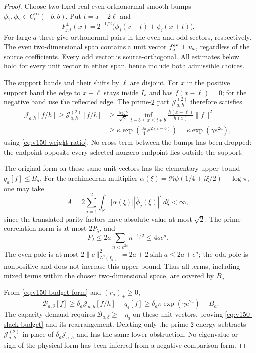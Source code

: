 \begin{proof}
Choose two fixed real even orthonormal smooth bumps
$\phi_1,\phi_2\in C_c^\infty(-b,b)$. Put $t=a-2\ell$ and
\[
 F_{j,t}^{\pm}(x)=2^{-1/2}\bigl(\phi_j(x-t)\pm\phi_j(x+t)\bigr).
\]
For large $a$ these give orthonormal pairs in the even and odd sectors,
respectively. The even two-dimensional span contains a unit vector
$f_a^{\rm ev}\perp u_a$, regardless of the source coefficients. Every
odd vector is source-orthogonal. All estimates below hold for every
unit vector in either span, hence include both admissible choices.

The support bands and their shifts by $\ell$ are disjoint. For $x$ in
the positive support band the edge to $x-\ell$ stays inside $I_a$ and
has $f(x-\ell)=0$; for the negative band use the reflected edge. The
prime-$2$ part $\mathcal J^{(2)}_{a,h}$ therefore satisfies
\begin{align*}
 \mathcal J_{a,h}[f/h]\ge\mathcal J^{(2)}_{a,h}[f/h]
 &\ge\frac{\log2}{\sqrt2}
       \inf_{t-b\le x\le t+b}\frac{h(x-\ell)}{h(x)}\|f\|^2\\
 &\ge\kappa\exp\!\left(\frac{3\pi}{4}e^{2(t-b)}\right)
 =\kappa\exp(\gamma e^{2a}),
\end{align*}
using \eqref{eq:v150-weight-ratio}. No cross term between the bumps
has been dropped: the endpoint opposite every selected nonzero endpoint
lies outside the support.

The original form on these same unit vectors has the elementary upper
bound $q_a[f]\le B_a$. For the archimedean multiplier
$\alpha(\xi)=\Re\psi(1/4+i\xi/2)-\log\pi$, one may take
\[
 A=2\sum_{j=1}^2\int_{\mathbb R}|\alpha(\xi)|
                      |\widehat\phi_j(\xi)|^2\,d\xi<\infty,
\]
since the translated parity factors have absolute value at most
$\sqrt2$. The prime correlation norm is at most $2P_\lambda$, and
\[
 P_\lambda\le 2a\sum_{n<e^{2a}}n^{-1/2}\le4ae^a.
\]
The even pole is at most $2\|c\|_{L^2(I_a)}^2
=2a+2\sinh a\le2a+e^a$; the odd pole is nonpositive and does not
increase this upper bound. Thus all terms, including mixed terms within
the chosen two-dimensional space, are covered by $B_a$.

From \eqref{eq:v150-budget-form} and $(r_a)_+\ge0$,
\[
 -\mathcal B_{a,\delta}[f]\ge
       \delta_a\mathcal J_{a,h}[f/h]-q_a[f]
 \ge\delta_a\kappa\exp(\gamma e^{2a})-B_a.
\]
The capacity demand requires $\mathcal B_{a,\delta}\ge-\eta_a$ on
these unit vectors, proving \eqref{eq:v150-slack-budget} and its
rearrangement. Deleting only the prime-$2$ energy subtracts
$\mathcal J^{(2)}_{a,h}$ in place of $\delta_a\mathcal J_{a,h}$ and
has the same lower obstruction. No eigenvalue or sign of the physical
form has been inferred from a negative comparison form.
\end{proof}

